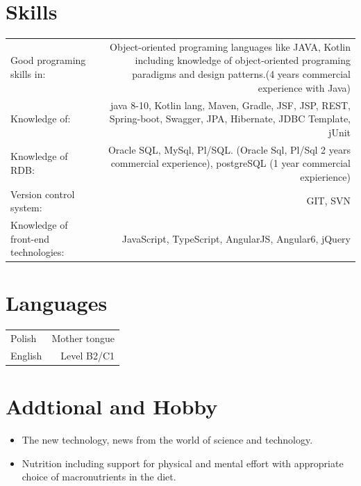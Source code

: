\documentclass[1pt]{my_cv}
\begin{document}
	\section*{Skills}
	\begin{tabular}{L!{\VRule}R}
		Good programing skills in:&Object-oriented programing languages like JAVA, Kotlin including knowledge of object-oriented programing paradigms and design patterns.(4 years commercial experience with Java)\\
		Knowledge of:& java 8-10, Kotlin lang, Maven, Gradle, JSF, JSP, REST, Spring-boot, Swagger, JPA, Hibernate, JDBC Template, jUnit\\
		Knowledge of RDB:& Oracle SQL, MySql, Pl/SQL. (Oracle Sql, Pl/Sql 2 years commercial experience), postgreSQL (1 year commercial expierience) \\
		Version control system:& GIT, SVN \\
		Knowledge of front-end technologies:& JavaScript, TypeScript, AngularJS, Angular6, jQuery
	\end{tabular}
	\section*{Languages}
	\begin{tabular}{L!{\VRule}R}
		Polish&Mother tongue\\
		English&Level B2/C1
	\end{tabular}
	\section*{Addtional and Hobby}	
		\begin{itemize} \itemsep 0pt \parskip 0pt \parsep 0pt 			
		\item The new technology, news from the world of science and technology.
		\item Nutrition including support for physical and mental effort with appropriate choice of macronutrients in the diet. 
		\end{itemize}

	
\end{document}
